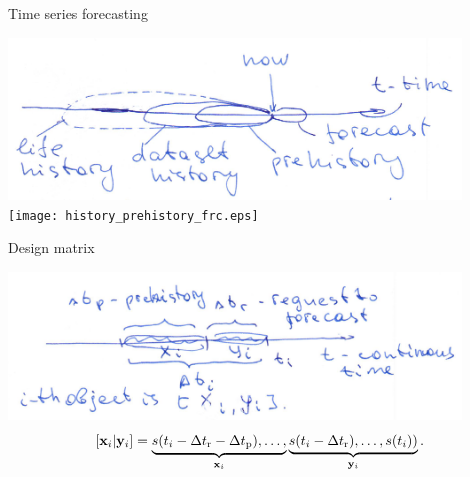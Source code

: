 \documentclass{beamer}
\begin{document}
\begin{frame}{Time series forecasting}

\includegraphics[width=0.9\textwidth]{online_forecasting_paradigm.png} \\


\texttt{[image: history\_prehistory\_frc.eps]}


\end{frame}
\begin{frame}{Design matrix}

\includegraphics[width=0.9\textwidth]{draw_object.png} \\

\[
[{\mathbf{x}}_i | {\mathbf{y}}_i] = \underbrace{s(t_i-\Delta t_\text{r}-\Delta t_\text{p}),\dots,}_{{\mathbf{x}}_i} \underbrace{s(t_i-\Delta t_\text{r}),\dots,s(t_i))}_{{\mathbf{y}}_i}. \]

\end{frame}
\end{document}
